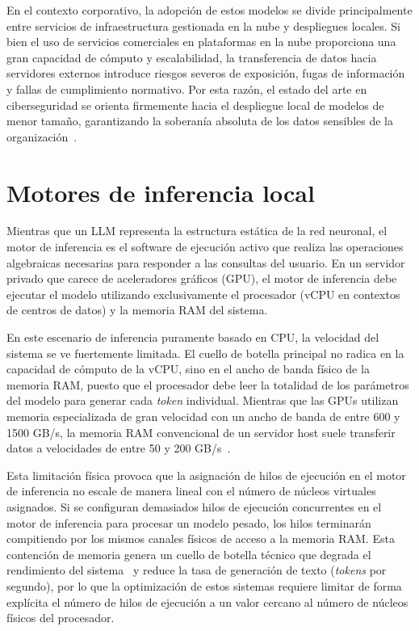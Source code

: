 \documentclass[12pt]{report}
\begin{document}
En el contexto corporativo, la adopción de estos modelos se divide principalmente entre servicios de infraestructura gestionada en la nube y despliegues locales. Si bien el uso de servicios comerciales en plataformas en la nube proporciona una gran capacidad de cómputo y escalabilidad, la transferencia de datos hacia servidores externos introduce riesgos severos de exposición, fugas de información y fallas de cumplimiento normativo. Por esta razón, el estado del arte en ciberseguridad se orienta firmemente hacia el despliegue local de modelos de menor tamaño, garantizando la soberanía absoluta de los datos sensibles de la organización~\cite{chen2025, levi2025toward}.

\section{Motores de inferencia local}

Mientras que un LLM representa la estructura estática de la red neuronal, el motor de inferencia es el software de ejecución activo que realiza las operaciones algebraicas necesarias para responder a las consultas del usuario. En un servidor privado que carece de aceleradores gráficos (GPU), el motor de inferencia debe ejecutar el modelo utilizando exclusivamente el procesador (vCPU en contextos de centros de datos) y la memoria RAM del sistema.

En este escenario de inferencia puramente basado en CPU, la velocidad del sistema se ve fuertemente limitada. El cuello de botella principal no radica en la capacidad de cómputo de la vCPU, sino en el ancho de banda físico de la memoria RAM, puesto que el procesador debe leer la totalidad de los parámetros del modelo para generar cada \textit{token} individual. Mientras que las GPUs utilizan memoria especializada de gran velocidad con un ancho de banda de entre 600 y 1500 GB/s, la memoria RAM convencional de un servidor host suele transferir datos a velocidades de entre 50 y 200 GB/s~\cite{hennessy2017computer}. 

Esta limitación física provoca que la asignación de hilos de ejecución en el motor de inferencia no escale de manera lineal con el número de núcleos virtuales asignados. Si se configuran demasiados hilos de ejecución concurrentes en el motor de inferencia para procesar un modelo pesado, los hilos terminarán compitiendo por los mismos canales físicos de acceso a la memoria RAM. Esta contención de memoria genera un cuello de botella técnico que degrada el rendimiento del sistema~\cite{kwon2023paged} y reduce la tasa de generación de texto (\textit{tokens} por segundo), por lo que la optimización de estos sistemas requiere limitar de forma explícita el número de hilos de ejecución a un valor cercano al número de núcleos físicos del procesador.
\end{document}
